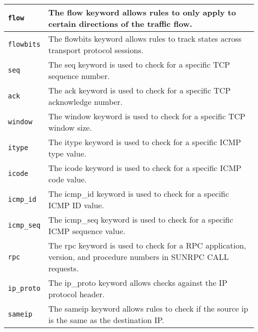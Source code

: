 \documentclass[english]{report}
\begin{document}
\begin{center}
\begin{longtable}[h]{| p{1in} | p{4.5in} |}
\hline
\texttt{flow} &

The flow keyword allows rules to only apply to certain directions of the
traffic flow. \\

\hline
\texttt{flowbits} &

The flowbits keyword allows rules to track states across transport protocol
sessions. \\

\hline
\texttt{seq} &

The seq keyword is used to check for a specific TCP sequence number. \\

\hline
\texttt{ack} &

The ack keyword is used to check for a specific TCP acknowledge number. \\

\hline
\texttt{window} &

The window keyword is used to check for a specific TCP window size. \\

\hline
\texttt{itype} &

The itype keyword is used to check for a specific ICMP type value. \\

\hline
\texttt{icode} &

The icode keyword is used to check for a specific ICMP code value. \\

\hline
\texttt{icmp\_id} &

The icmp\_id keyword is used to check for a specific ICMP ID value. \\

\hline
\texttt{icmp\_seq} &

The icmp\_seq keyword is used to check for a specific ICMP sequence value. \\

\hline
\texttt{rpc} &

The rpc keyword is used to check for a RPC application, version, and procedure
numbers in SUNRPC CALL requests. \\

\hline
\texttt{ip\_proto} &

The ip\_proto keyword allows checks against the IP protocol header. \\

\hline
\texttt{sameip} &

The sameip keyword allows rules to check if the source ip is the same as the
destination IP. \\

\hline
\end{longtable}
\end{center}
\end{document}
